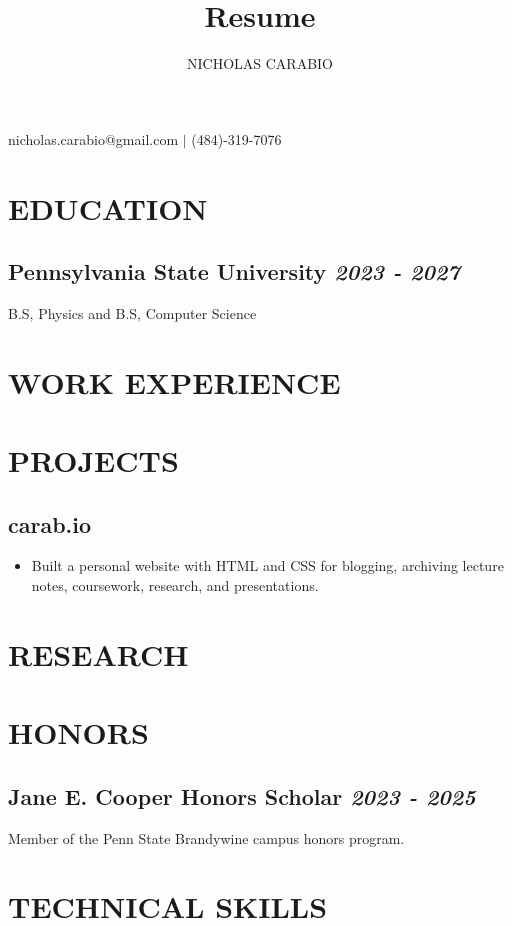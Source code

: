 \documentclass{article}
\makeatletter
\renewcommand{\maketitle}{
\begin{center}
{\huge\bfseries\theauthor}

\vspace{.25em}

nicholas.carabio@gmail.com $|$ (484)-319-7076
\end{center}
}
\newcommand{\bd}{\textbf}
\makeatother
\begin{document}
\title{Resume}
\author{NICHOLAS CARABIO}

\maketitle

\section{EDUCATION}

\subsection{\textbf{Pennsylvania State University} \hfill \textit{2023 - 2027}}
B.S, Physics and B.S, Computer Science

\section{WORK EXPERIENCE}

\section{PROJECTS}
\subsection{\bd{carab.io}}
\begin{itemize}
    \item Built a personal website with HTML and CSS for blogging, archiving lecture notes, coursework, research, and presentations.
\end{itemize}

\section{RESEARCH}

\section{HONORS}
\subsection{\textbf{Jane E. Cooper Honors Scholar} \hfill \textit{2023 - 2025}}
Member of the Penn State Brandywine campus honors program.

\section{TECHNICAL SKILLS}  
\end{document}
